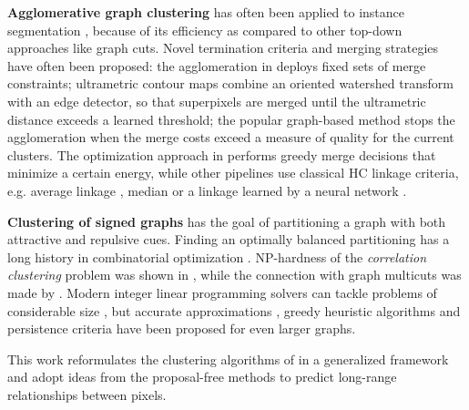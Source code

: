 \textbf{Agglomerative graph clustering} has often been applied to instance segmentation \cite{ren2013image,liu2016image,salembier2000binary}, because of its efficiency as compared to other top-down approaches like graph cuts. 
Novel termination criteria and merging strategies have often been proposed: the agglomeration in \cite{malmberg2011generalized} deploys fixed sets of merge constraints; ultrametric contour maps \cite{arbelaez2011contour} combine an oriented watershed transform with an edge detector, so that superpixels are merged until the ultrametric distance exceeds a learned threshold; the popular graph-based method \cite{felzenszwalb2004efficient} stops the agglomeration when the merge costs exceed a measure of quality for the current clusters. 
The optimization approach in \cite{kiran2014global} performs greedy merge decisions that minimize a certain energy, while other pipelines use classical HC linkage criteria, e.g. average linkage \cite{liu2018affinity,lee2017superhuman}, median \cite{funke2018large} or a linkage learned by a neural network \cite{nunez2013machine,knowles2016rhoananet}.

\textbf{Clustering of signed graphs} has the goal of partitioning a graph with both attractive and repulsive cues. Finding an optimally balanced partitioning has a long history in combinatorial optimization \cite{grotschel1989cutting,grotschel1990facets,chopra1993partition}. %
NP-hardness of the \emph{correlation clustering} problem was shown in \cite{bansal2004correlation}, while the connection with graph multicuts was made by \cite{demaine2006correlation}. Modern integer linear programming solvers can tackle problems of considerable size \cite{andres2012globally}, but accurate approximations \cite{pape2017solving,beier2016efficient,yarkony2012fast}, greedy heuristic algorithms \cite{levinkov2017comparative,wolf2018mutex,keuper2015efficient,kardoostsolving} and persistence criteria \cite{lange2018partial,lange2018combinatorial} have been proposed for even larger graphs.

This work reformulates the clustering algorithms of \cite{levinkov2017comparative,wolf2018mutex,keuper2015efficient} in a generalized framework and adopt ideas from the proposal-free methods \cite{liu2018affinity,wolf2018mutex,funke2018large} to predict long-range relationships between pixels.
